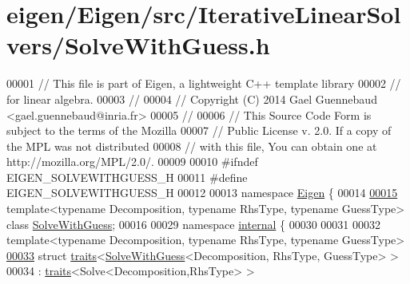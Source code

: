 \hypertarget{eigen_2_eigen_2src_2_iterative_linear_solvers_2_solve_with_guess_8h_source}{}\section{eigen/\+Eigen/src/\+Iterative\+Linear\+Solvers/\+Solve\+With\+Guess.h}
\label{eigen_2_eigen_2src_2_iterative_linear_solvers_2_solve_with_guess_8h_source}

\begin{DoxyCode}
00001 \textcolor{comment}{// This file is part of Eigen, a lightweight C++ template library}
00002 \textcolor{comment}{// for linear algebra.}
00003 \textcolor{comment}{//}
00004 \textcolor{comment}{// Copyright (C) 2014 Gael Guennebaud <gael.guennebaud@inria.fr>}
00005 \textcolor{comment}{//}
00006 \textcolor{comment}{// This Source Code Form is subject to the terms of the Mozilla}
00007 \textcolor{comment}{// Public License v. 2.0. If a copy of the MPL was not distributed}
00008 \textcolor{comment}{// with this file, You can obtain one at http://mozilla.org/MPL/2.0/.}
00009 
00010 \textcolor{preprocessor}{#ifndef EIGEN\_SOLVEWITHGUESS\_H}
00011 \textcolor{preprocessor}{#define EIGEN\_SOLVEWITHGUESS\_H}
00012 
00013 \textcolor{keyword}{namespace }\hyperlink{namespace_eigen}{Eigen} \{
00014 
\hyperlink{group___iterative_linear_solvers___module}{00015} \textcolor{keyword}{template}<\textcolor{keyword}{typename} Decomposition, \textcolor{keyword}{typename} RhsType, \textcolor{keyword}{typename} GuessType> \textcolor{keyword}{class }
      \hyperlink{group___iterative_linear_solvers___module_class_eigen_1_1_solve_with_guess}{SolveWithGuess};
00016   
00029 \textcolor{keyword}{namespace }\hyperlink{namespaceinternal}{internal} \{
00030 
00031 
00032 \textcolor{keyword}{template}<\textcolor{keyword}{typename} Decomposition, \textcolor{keyword}{typename} RhsType, \textcolor{keyword}{typename} GuessType>
\hyperlink{struct_eigen_1_1internal_1_1traits_3_01_solve_with_guess_3_01_decomposition_00_01_rhs_type_00_01_guess_type_01_4_01_4}{00033} \textcolor{keyword}{struct }\hyperlink{struct_eigen_1_1internal_1_1traits}{traits}<\hyperlink{group___iterative_linear_solvers___module_class_eigen_1_1_solve_with_guess}{SolveWithGuess}<Decomposition, RhsType, GuessType> >
00034   : \hyperlink{struct_eigen_1_1internal_1_1traits}{traits}<Solve<Decomposition,RhsType> >

\end{DoxyCode}
